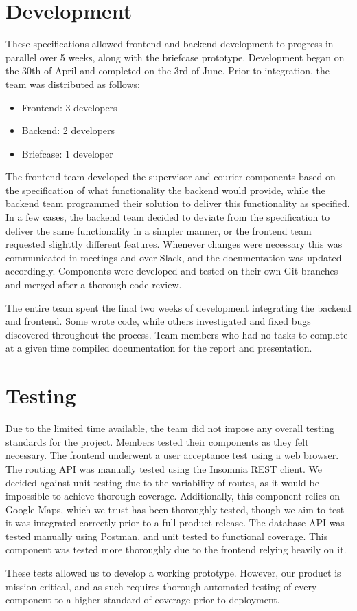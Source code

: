 \section{Development}

These specifications allowed frontend and backend development to progress in parallel over 5 weeks, along with the briefcase prototype. Development began on the 30th of April and completed on the 3rd of June. Prior to integration, the team was distributed as follows:

\begin{itemize}
    \item Frontend: 3 developers
    \item Backend: 2 developers
    \item Briefcase: 1 developer
\end{itemize}

The frontend team developed the supervisor and courier components based on the specification of what functionality the backend would provide, while the backend team programmed their solution to deliver this functionality as specified. In a few cases, the backend team decided to deviate from the specification to deliver the same functionality in a simpler manner, or the frontend team requested slighttly different features. Whenever changes were necessary this was communicated in meetings and over Slack, and the documentation was updated accordingly. Components were developed and tested on their own Git branches and merged after a thorough code review.

The entire team spent the final two weeks of development integrating the backend and frontend. Some wrote code, while others investigated and fixed bugs discovered throughout the process. Team members who had no tasks to complete at a given time compiled documentation for the report and presentation.

\section{Testing}
Due to the limited time available, the team did not impose any overall testing standards for the project. Members tested their components as they felt necessary. The frontend underwent a user acceptance test using a web browser. The routing API was manually tested using the Insomnia REST client. We decided against unit testing due to the variability of routes, as it would be impossible to achieve thorough coverage. Additionally, this component relies on Google Maps, which we trust has been thoroughly tested, though we aim to test it was integrated correctly prior to a full product release. The database API was tested manually using Postman, and unit tested to functional coverage. This component was tested more thoroughly due to the frontend relying heavily on it.

These tests allowed us to develop a working prototype. However, our product is mission critical, and as such requires thorough automated testing of every component to a higher standard of coverage prior to deployment.
